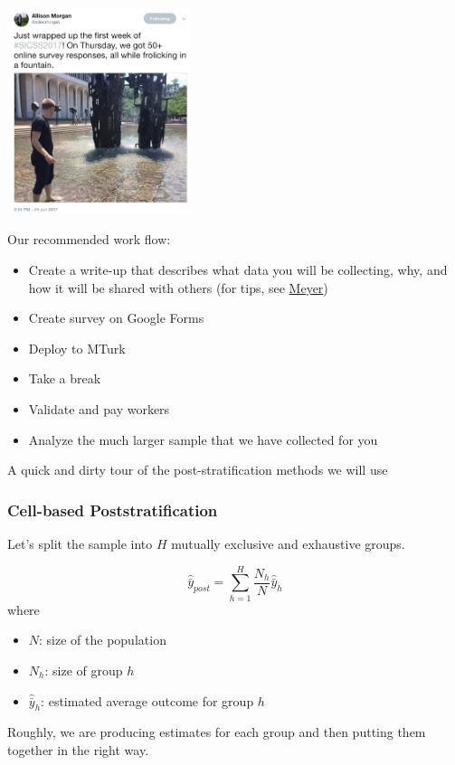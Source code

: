 \documentclass[aspectratio=169]{beamer}
\begin{document}
\begin{frame}

\begin{center}
\includegraphics[width=0.4\textwidth]{figures/morgan_tweet}
\end{center}

\end{frame}
\begin{frame}

Our recommended work flow:
\begin{itemize}
\item Create a write-up that describes what data you will be collecting, why, and how it will be shared with others (for tips, see \href{https://doi.org/10.1177/2515245917747656}{Meyer})
\item Create survey on Google Forms
\item Deploy to MTurk
\item Take a break
\pause
\item Validate and pay workers
\pause
\item Analyze the much larger sample that we have collected for you
\end{itemize}

\end{frame}
\begin{frame}

A quick and dirty tour of the post-stratification methods we will use

\end{frame}
\begin{frame}
\frametitle{Cell-based Poststratification}

Let's split the sample into $H$ mutually exclusive and exhaustive groups.  

\begin{equation*}
\hat{\bar{y}}_{post} = \sum_{h=1}^H \frac{N_h}{N} \hat{\bar{y}}_h
\end{equation*}
where 
\begin{itemize}
\item $N$: size of the population
\item $N_h$: size of group $h$
\item $\hat{\bar{y}}_h$: estimated average outcome for group $h$
\end{itemize}
\vfill
Roughly, we are producing estimates for each group and then putting them together in the right way.

\end{frame}
\end{document}
